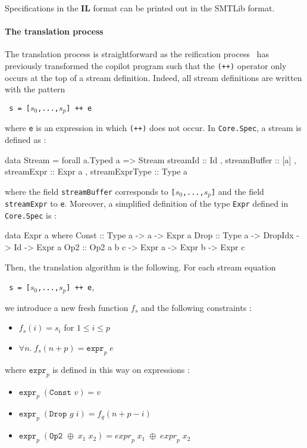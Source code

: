 \medskip

Specifications in the \textbf{IL} format can be printed out in the SMTLib format.

\paragraph{The translation process} 

The translation process is straightforward as the reification process~\cite{} has previously transformed the copilot program such that the \texttt{(++)} operator only occurs at the top of a stream definition. Indeed, all stream definitions are written with the pattern
\begin{center}\texttt{ s = [$s_0$,...,$s_p$] ++ e}\end{center}
where \texttt{e} is an expression in which \texttt{(++)} does not occur. In \texttt{Core.Spec}, a stream is defined as :
\begin{code}
data Stream = forall a.Typed a => Stream
  { streamId         :: Id
  , streamBuffer     :: [a]
  , streamExpr       :: Expr a
  , streamExprType   :: Type a }
\end{code}
where the field \texttt{streamBuffer} corresponds to \texttt{[$s_0$,...,$s_p$]} and the field \texttt{streamExpr} to \texttt{e}. Moreover, a simplified definition of the type \texttt{Expr} defined in \texttt{Core.Spec} is :
\begin{code}
data Expr a where
  Const  :: Type a -> a -> Expr a
  Drop   :: Type a -> DropIdx -> Id -> Expr a
  Op2    :: Op2 a b c -> Expr a -> Expr b -> Expr c
\end{code}
Then, the translation algorithm is the following. For each stream equation \begin{center}\texttt{ s = [$s_0$,...,$s_p$] ++ e},\end{center}we introduce a new fresh function $f_s$ and the following constraints :

\begin{itemize}
\item $f_s(i) = s_i$ \quad for $1 \leq i \leq p$
\item $\forall n . \; f_s(n + p) = \texttt{expr}_p \; e$
\end{itemize}
where $\texttt{expr}_p$ is defined in this way on expressions :
\begin{itemize}
\item $\texttt{expr}_p \; (\texttt{Const } v) = v$
\item $\texttt{expr}_p \; (\texttt{Drop } g \; i) = f_g(n + p - i)$
\item $\texttt{expr}_p \; (\texttt{Op2 } \oplus \; x_1 \; x_2) =  {expr}_p \; x_1 \; \oplus \; {expr}_p \; x_2 $
\end{itemize}


